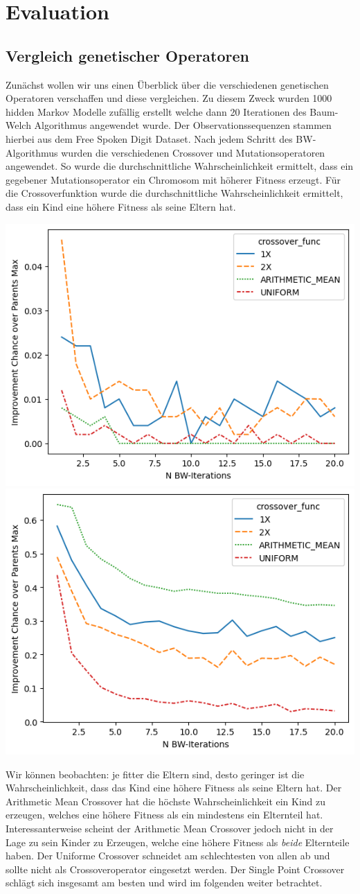 \chapter{Evaluation}\label{ch:evaluation}
\section*{Vergleich genetischer Operatoren}
Zunächst wollen wir uns einen Überblick über die verschiedenen genetischen Operatoren verschaffen und diese vergleichen. Zu diesem Zweck wurden 1000 hidden Markov Modelle zufällig erstellt welche dann 20 Iterationen des Baum-Welch Algorithmus angewendet wurde. Der Observationssequenzen stammen hierbei aus dem Free Spoken Digit Dataset. Nach jedem Schritt des BW-Algorithmus wurden die verschiedenen Crossover und Mutationsoperatoren angewendet. So wurde die durchschnittliche Wahrscheinlichkeit ermittelt, dass ein gegebener Mutationsoperator ein Chromosom mit höherer Fitness erzeugt. Für die Crossoverfunktion wurde die durchschnittliche Wahrscheinlichkeit ermittelt, dass ein Kind eine höhere Fitness als seine Eltern hat.

\includegraphics[width=0.5\linewidth]{images/charts/crossover_function_improvement_chance_parents_max.png}
\includegraphics[width=0.5\linewidth]{images/charts/crossover_function_improvement_chance_parents_min.png}

Wir können beobachten: je fitter die Eltern sind, desto geringer ist die Wahrscheinlichkeit, dass das Kind eine höhere Fitness als seine Eltern hat. Der Arithmetic Mean Crossover hat die höchste Wahrscheinlichkeit ein Kind zu erzeugen, welches eine höhere Fitness als ein mindestens ein Elternteil hat. Interessanterweise scheint der Arithmetic Mean Crossover jedoch nicht in der Lage zu sein Kinder zu Erzeugen, welche eine höhere Fitness als \textit{beide} Elternteile haben. Der Uniforme Crossover schneidet am schlechtesten von allen ab und sollte nicht als Crossoveroperator eingesetzt werden. Der Single Point Crossover schlägt sich insgesamt am besten und wird im folgenden weiter betrachtet. 

